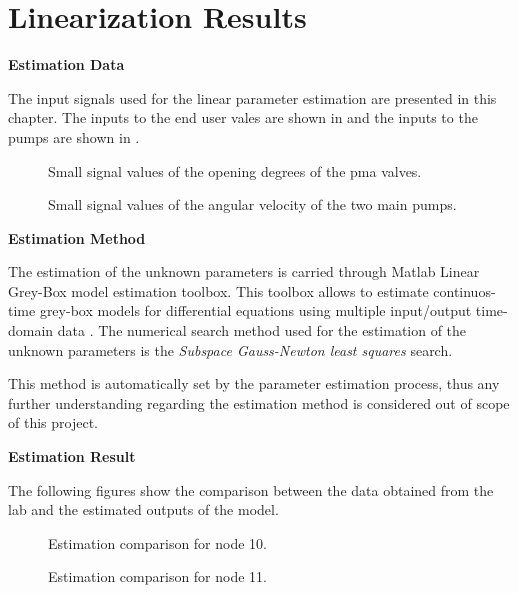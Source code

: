 \chapter{Linearization Results}
\label{LinResults}
\textbf{Estimation Data}

The input signals used for the linear parameter estimation are presented in this chapter.  
The inputs to the end user vales are shown in  and the inputs to the pumps are shown in . 


\begin{figure}[H]
  \centering
  \begin{minipage}[b]{0.45\textwidth}
     
    \caption{Small signal values of the opening degrees of the pma valves. }
    \label{fig:est_OD_data}
  \end{minipage}
  \hfill
  \begin{minipage}[b]{0.45\textwidth}
     
    \caption{Small signal values of the angular velocity of the two main pumps.}
    \label{fig:est_deltap_data}
  \end{minipage}
\end{figure}

\textbf{Estimation Method}

The estimation of the unknown parameters is carried through Matlab Linear Grey-Box model estimation toolbox. This toolbox allows to estimate continuos-time 
grey-box models for differential equations using multiple input/output time-domain data \cite{LinearEstimation}.
The numerical search method used for the estimation of the unknown parameters is the \textit{Subspace Gauss-Newton least squares} search. 

This method is automatically set by the parameter estimation process, thus any further understanding regarding the estimation method is considered out of 
scope of this project. 


\textbf{Estimation Result}

 

The following figures show the comparison between the data obtained from the lab and the estimated outputs of the model.  

\begin{figure}[H]
  \centering
  \begin{minipage}[b]{0.45\textwidth}
     
    \caption{Estimation comparison for node 10.}
  \end{minipage}
  \hfill
  \begin{minipage}[b]{0.45\textwidth}
     
    \caption{Estimation comparison for node 11.}
  \end{minipage}
\end{figure}

